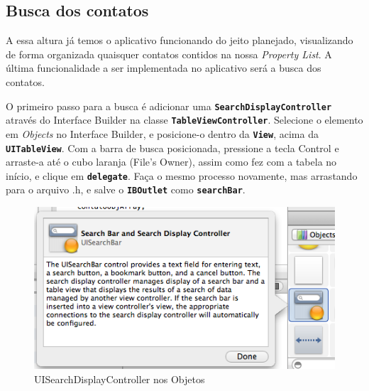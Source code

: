 \documentclass[a4paper,12pt,brazil,doubleside]{book}
\begin{document}
\begin{singlespace}
\subsection{Busca dos contatos}


A essa altura já temos o aplicativo funcionando do jeito planejado, visualizando de forma organizada quaisquer contatos contidos na nossa \emph{Property List}. A última funcionalidade a ser implementada no aplicativo será a busca dos contatos.

O primeiro passo para a busca é adicionar uma \texttt{\textbf{SearchDisplayController}} através do Interface Builder na classe \texttt{\textbf{TableViewController}}. Selecione o elemento em \emph{Objects} no Interface Builder, e posicione-o dentro da \texttt{\textbf{View}}, acima da \texttt{\textbf{UITableView}}. Com a barra de busca posicionada, pressione a tecla Control e arraste-a até o cubo laranja (File's Owner), assim como fez com a tabela no início, e clique em \texttt{\textbf{delegate}}. Faça o mesmo processo novamente, mas arrastando para o arquivo .h, e salve o \texttt{\textbf{IBOutlet}} como \texttt{\textbf{searchBar}}.

\bigskip
\bigskip

\begin{figure}[H]
  \centering
  \includegraphics[width=.75\textwidth]{figuras/table/table2.png}
  \caption{UISearchDisplayController nos Objetos}
  \label{fig:a}
\end{figure}

\bigskip


\end{singlespace}
\end{document}
